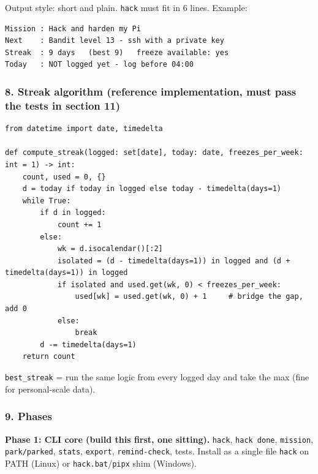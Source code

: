 Output style: short and plain. \texttt{hack} must fit in 6 lines.
Example:

\begin{verbatim}
Mission : Hack and harden my Pi
Next    : Bandit level 13 - ssh with a private key
Streak  : 9 days   (best 9)   freeze available: yes
Today   : NOT logged yet - log before 04:00
\end{verbatim}

\hypertarget{hackstreak-spec-8-streak-algorithm-reference-implementation-must-pass-the-tests-in-section-11}{%
\subsubsection{8. Streak algorithm (reference implementation, must pass
the tests in section
11)}\label{hackstreak-spec-8-streak-algorithm-reference-implementation-must-pass-the-tests-in-section-11}}

\begin{verbatim}
from datetime import date, timedelta

def compute_streak(logged: set[date], today: date, freezes_per_week: int = 1) -> int:
    count, used = 0, {}
    d = today if today in logged else today - timedelta(days=1)
    while True:
        if d in logged:
            count += 1
        else:
            wk = d.isocalendar()[:2]
            isolated = (d - timedelta(days=1)) in logged and (d + timedelta(days=1)) in logged
            if isolated and used.get(wk, 0) < freezes_per_week:
                used[wk] = used.get(wk, 0) + 1     # bridge the gap, add 0
            else:
                break
        d -= timedelta(days=1)
    return count
\end{verbatim}

\texttt{best\_streak} = run the same logic from every logged day and
take the max (fine for personal-scale data).

\hypertarget{hackstreak-spec-9-phases}{%
\subsubsection{9. Phases}\label{hackstreak-spec-9-phases}}

\textbf{Phase 1: CLI core (build this first, one sitting).}
\texttt{hack}, \texttt{hack done}, \texttt{mission},
\texttt{park/parked}, \texttt{stats}, \texttt{export},
\texttt{remind-check}, tests. Install as a single file \texttt{hack} on
PATH (Linux) or \texttt{hack.bat}/\texttt{pipx} shim (Windows).

